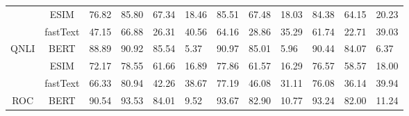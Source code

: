 \begin{table}[th]
\begin{tabular}{c|c|llll|lll|lll}
\multicolumn{1}{c|}{}                        & ESIM                       & \multicolumn{1}{l|}{76.82}    & 85.80                         & 67.34                         & 18.46                         & 85.51                         & 67.48                         & 18.03                         & 84.38                         & 64.15                         & 20.23                        \\
\multicolumn{1}{c|}{}                        & fastText                   & \multicolumn{1}{l|}{47.15}    & 66.88                         & 26.31                         & 40.56                         & 64.16                         & 28.86                         & 35.29                         & 61.74                         & 22.71                         & 39.03                        \\ \hline
\multicolumn{1}{c|}{\multirow{3}{*}{QNLI}}   & BERT                       & \multicolumn{1}{l|}{88.89}    & 90.92                         & 85.54                         & 5.37                          & 90.97                         & 85.01                         & 5.96                          & 90.44                         & 84.07                         & 6.37                         \\
\multicolumn{1}{c|}{}                        & ESIM                       & \multicolumn{1}{l|}{72.17}    & 78.55                         & 61.66                         & 16.89                         & 77.86                         & 61.57                         & 16.29                         & 76.57                         & 58.57                         & 18.00                        \\
\multicolumn{1}{c|}{}                        & fastText                   & \multicolumn{1}{l|}{66.33}    & 80.94                         & 42.26                         & 38.67                         & 77.19                         & 46.08                         & 31.11                         & 76.08                         & 36.14                         & 39.94                        \\ \hline
\multicolumn{1}{c|}{\multirow{3}{*}{ROC}}    & BERT                       & \multicolumn{1}{l|}{90.54}    & 93.53                         & 84.01                         & 9.52                          & 93.67                         & 82.90                         & 10.77                         & 93.24                         & 82.00                         & 11.24                        \\

\end{tabular}
\end{table}
